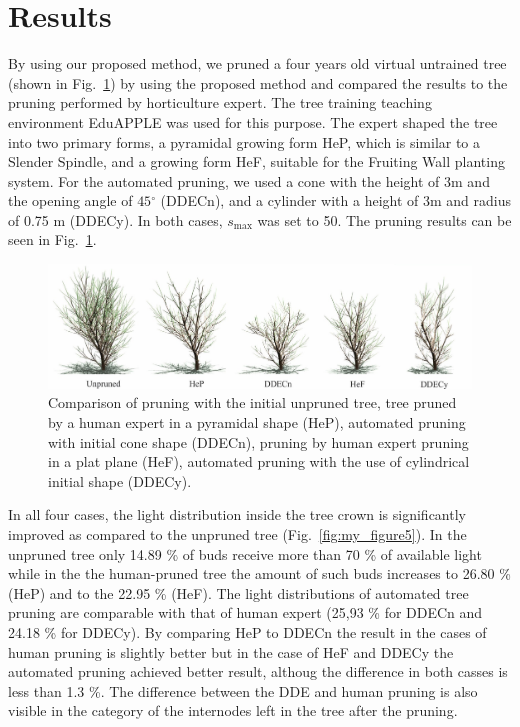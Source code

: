 
\section{Results}
By using our proposed method, we pruned a four years old virtual
untrained tree (shown in Fig.~\ref{fig:my_figure4}) by using the proposed method and
compared the results to the pruning performed by horticulture expert.
The tree training teaching environment EduAPPLE \cite{kohek_eduapple:_2015} was used for
this purpose. The expert shaped the tree into two primary forms, a
pyramidal growing form HeP, which is similar to a Slender Spindle, and a
growing form HeF, suitable for the Fruiting Wall planting system. For
the automated pruning, we used a cone with the height of \(3\)m and the
opening angle of \(45{^\circ}\) (DDECn), and a cylinder with a height of
3m and radius of 0.75 m (DDECy). In both cases, \(s_{\mathrm{\max}}\)
was set to 50. The pruning results can be seen in Fig.~\ref{fig:my_figure4}.
\begin{figure}[hbt]
    \centering
    \includegraphics[width=5.4in]{figs/image4.jpeg}
    \caption{Comparison of pruning with the initial unpruned tree,
tree pruned by a human expert in a pyramidal shape (HeP), automated
pruning with initial cone shape (DDECn), pruning by human expert pruning
in a plat plane (HeF), automated pruning with the use of cylindrical
initial shape (DDECy).}
    \label{fig:my_figure4}
\end{figure}

In all four cases, the light distribution inside the tree crown is
significantly improved as compared to the unpruned tree (Fig.~\ref{fig:my_figure5}). In the unpruned
tree only 14.89 \% of buds receive more than 70 \% of available light while in the the human-pruned tree the amount of such buds increases to 26.80 \% (HeP) and to the 22.95 \% (HeF).
The light distributions of automated tree pruning are comparable with
that of human expert (25,93 \% for DDECn and 24.18 \% for DDECy). By comparing HeP to DDECn the result in the cases of human pruning is slightly better but in the case of HeF and DDECy the automated pruning achieved better result, althoug the difference in both casses is less than 1.3 \%. The difference between the DDE
and human pruning is also visible in the category of the internodes left
in the tree after the pruning.

